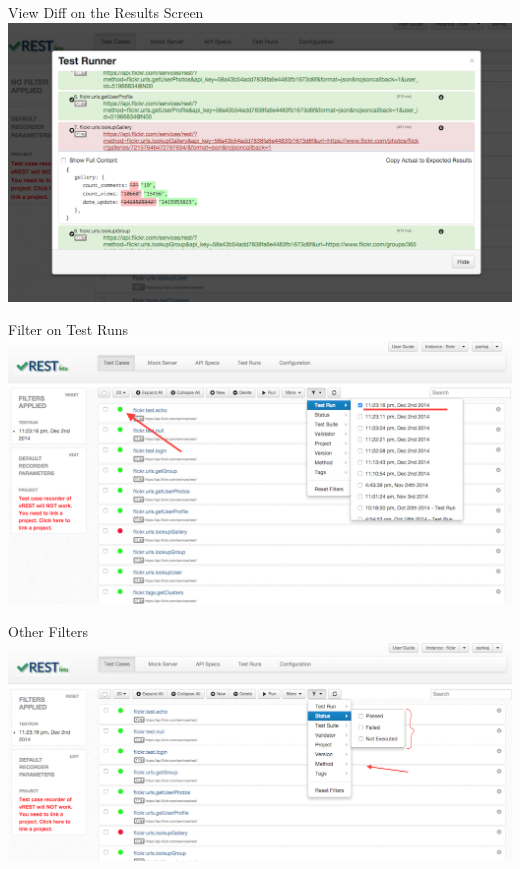 \documentclass{beamer}
\begin{document}
\begin{frame}{View Diff on the Results Screen}
    \includegraphics[scale=0.30]{images/test_results_diff.PNG}
\end{frame}
\begin{frame}{Filter on Test Runs}
    \includegraphics[scale=0.30]{images/filter_on_test_runs.PNG}
\end{frame}
\begin{frame}{Other Filters}
    \includegraphics[scale=0.30]{images/filter_on_pass_fail.PNG}
\end{frame}
\end{document}
